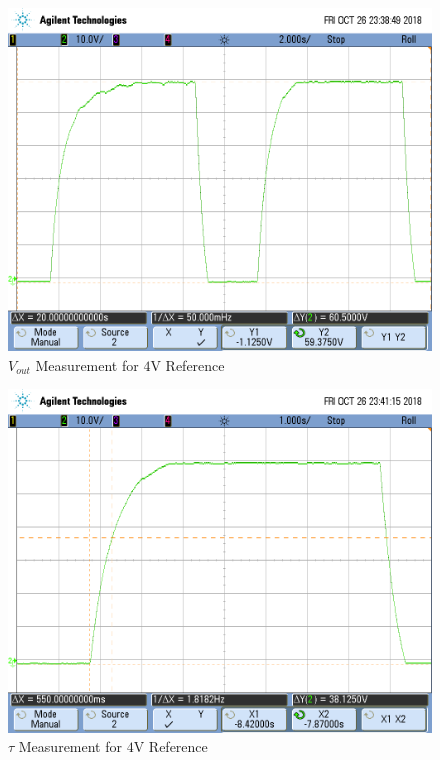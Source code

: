 \FloatBarrier

\FloatBarrier

\begin{figure}[h!]
	\centering
	\includegraphics[scale=0.75]{../images/scope_7.PNG}
	\caption{$V_{out}$ Measurement for $4$\si{\volt} Reference}
	\label{fig:scope_7}
\end{figure}

\FloatBarrier

\FloatBarrier

\begin{figure}[h!]
	\centering
	\includegraphics[scale=0.75]{../images/scope_8.PNG}
	\caption{$\tau$ Measurement for $4$\si{\volt} Reference}
	\label{fig:scope_8}
\end{figure}

